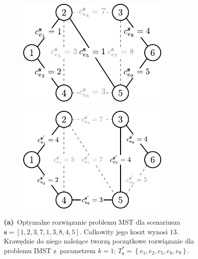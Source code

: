 \begin{figure}[!htbp]
	\null\hfill
	\begin{subfigure}[b]{0.32\textwidth}
		\includegraphics[width=\textwidth]{Chapter_IV/INC-MST-example/a}
		\caption{}
		\label{fig:imstExample:a}
	\end{subfigure}
	\hfill
	\begin{subfigure}[b]{0.32\textwidth}
		\includegraphics[width=\textwidth]{Chapter_IV/INC-MST-example/b}
		\caption{}
		\label{fig:imstExample:b}
	\end{subfigure}
	\hfill\null
	\caption{
		\textbf{(a)}~Optymalne rozwiązanie problemu \textsc{MST} dla scenariusza $\textbf{s} = \left[ 1, 2, 3, 7, 1, 3, 8, 4, 5 \right]$.
		Całkowity jego koszt wynosi $13$.
		Krawędzie do niego należące tworzą początkowe rozwiązanie dla problemu \textsc{IMST} z~parametrem $k = 1$: $T^{\ast}_{\textbf{s}} = \left\{ e_{1}, e_{2}, e_{5}, e_{8}, e_{9} \right\}$.
}
\end{figure}
